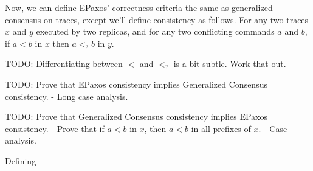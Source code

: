 Now, we can define EPaxos' correctness criteria the same as generalized
consensus on traces, except we'll define consistency as follows. For any two
traces $x$ and $y$ executed by two replicas, and for any two conflicting
commands $a$ and $b$, if $a < b$ in $x$ then $a <_? b$ in $y$.

TODO: Differentiating between $<$ and $<_?$ is a bit subtle. Work that out.

TODO: Prove that EPaxos consistency implies Generalized Consensus consistency.
- Long case analysis.

TODO: Prove that Generalized Consensus consistency implies EPaxos consistency.
- Prove that if $a < b$ in $x$, then $a < b$ in all prefixes of $x$.
- Case analysis.

%
%
%
%
%
Defining %
